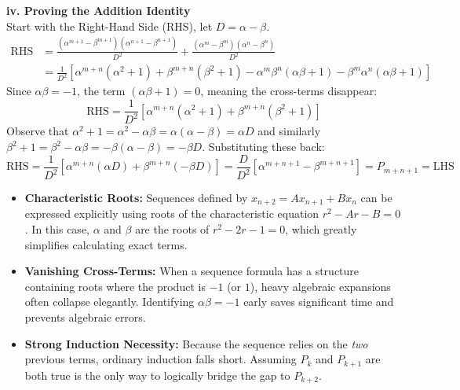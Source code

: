 \begin{solution}
\textbf{iv. Proving the Addition Identity}\\
Start with the Right-Hand Side (RHS), let $D = \alpha - \beta$.
\begin{align*}
\text{RHS} &= \frac{(\alpha^{m+1}-\beta^{m+1})(\alpha^{n+1}-\beta^{n+1})}{D^2} + \frac{(\alpha^m-\beta^m)(\alpha^n-\beta^n)}{D^2}\\
&= \frac{1}{D^2} [\alpha^{m+n}(\alpha^2 + 1) + \beta^{m+n}(\beta^2 + 1) - \alpha^m\beta^n(\alpha\beta + 1) - \beta^m\alpha^n(\alpha\beta + 1)]
\end{align*}
Since $\alpha\beta = -1$, the term $(\alpha\beta + 1) = 0$, meaning the cross-terms disappear:
\[
\text{RHS} = \frac{1}{D^2} [\alpha^{m+n}(\alpha^2 + 1) + \beta^{m+n}(\beta^2 + 1)]
\]
Observe that $\alpha^2 + 1 = \alpha^2 - \alpha\beta = \alpha(\alpha - \beta) = \alpha D$ and similarly $\beta^2 + 1 = \beta^2 - \alpha\beta = -\beta(\alpha - \beta) = -\beta D$. Substituting these back:
\[
\text{RHS} = \frac{1}{D^2} [\alpha^{m+n}(\alpha D) + \beta^{m+n}(-\beta D)] = \frac{D}{D^2} [\alpha^{m+n+1} - \beta^{m+n+1}] = P_{m+n+1} = \text{LHS}
\]
\end{solution}

\begin{takeaways}
\begin{itemize}[leftmargin=*]
    \item \textbf{Characteristic Roots:} Sequences defined by $x_{n+2} = Ax_{n+1} + Bx_n$ can be expressed explicitly using roots of the characteristic equation $r^2 - Ar - B = 0$. In this case, $\alpha$ and $\beta$ are the roots of $r^2 - 2r - 1 = 0$, which greatly simplifies calculating exact terms.
    \item \textbf{Vanishing Cross-Terms:} When a sequence formula has a structure containing roots where the product is $-1$ (or $1$), heavy algebraic expansions often collapse elegantly. Identifying $\alpha\beta = -1$ early saves significant time and prevents algebraic errors.
    \item \textbf{Strong Induction Necessity:} Because the sequence relies on the \textit{two} previous terms, ordinary induction falls short. Assuming $P_k$ and $P_{k+1}$ are both true is the only way to logically bridge the gap to $P_{k+2}$.
\end{itemize}
\end{takeaways}
